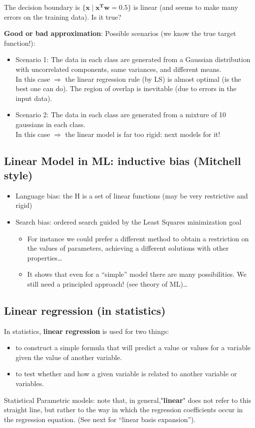 \documentclass[../main.tex]{subfiles}
\begin{document}
The decision boundary is $\{\mathbf{x} \;|\; \mathbf{x^Tw} = 0.5 \}$ is linear (and seems to make many errors on the training data). Is it true?

\noindent \textbf{Good or bad approximation}:
Possible scenarios (we know the true target function!):
\begin{itemize}
    \item Scenario 1: The data in each class are generated from a Gaussian distribution with uncorrelated components, same variances, and different means.\\
    In this case $\Rightarrow$ the linear regression rule (by LS) is almost optimal (is the best one can do). The region of overlap is inevitable (due to errors in the input data). 
    \item Scenario 2: The data in each class are generated from a mixture of 10 gaussians in each class.\\
     In this case  $\Rightarrow$ the linear model is far too rigid: next models for it!
\end{itemize}

\subsection{Linear Model in ML: inductive bias (Mitchell style)}%
\begin{itemize}
    \item Language bias: the H is a set of linear functions (may be very restrictive and rigid)
    \item  Search bias: ordered search guided by the Least Squares minimization goal
	\begin{itemize}
	    \item For instance we could prefer a different method to obtain a restriction on the values of parameters, achieving a different solutions with other properties…
	    \item It shows that even for a “simple” model there are many possibilities.  We still need a principled approach! (see theory of ML)…
	\end{itemize}
\end{itemize}

\subsection{Linear regression (in statistics)}
In statistics, \textbf{linear regression} is used for two things:
\begin{itemize}
    \item to construct a simple formula that will predict a value or values for a variable
given the value of another variable.
    \item to test whether and how a given variable is related to another variable or variables.
\end{itemize}
Statistical Parametric models: note that, in general,"\textbf{linear}" does not refer to this straight line, but rather to the way in which the regression coefficients occur in the regression equation. (See next for “linear basis expansion”).
\end{document}
